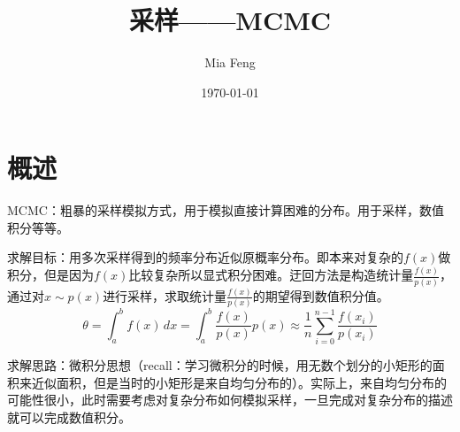 \documentclass{ctexart}
\title{采样——MCMC} %
\author{Mia Feng} %
\date{\today} %
\begin{document}
\maketitle %




\section{概述}
MCMC：粗暴的采样模拟方式，用于模拟直接计算困难的分布。用于采样，数值积分等等。

求解目标：用多次采样得到的频率分布近似原概率分布。即本来对复杂的$f\left(x\right)$做积分，但是因为$f\left(x\right)$比较复杂所以显式积分困难。迂回方法是构造统计量$\frac{f\left(x\right)}{p\left(x\right)}$，通过对$x\sim p\left(x\right)$进行采样，求取统计量$\frac{f\left(x\right)}{p\left(x\right)}$的期望得到数值积分值。
\begin{equation}
\theta = \int_{a}^{b}f\left(x\right)\,dx=\int_{a}^{b}\frac{f\left(x\right)}{p\left(x\right)}p\left(x\right)\approx \frac{1}{n}\sum\limits_{i=0}^{n-1}\frac{f\left(x_i\right)}{p\left(x_i\right)}
\end{equation}

求解思路：微积分思想（recall：学习微积分的时候，用无数个划分的小矩形的面积来近似面积，但是当时的小矩形是来自均匀分布的）。实际上，来自均匀分布的可能性很小，此时需要考虑对复杂分布如何模拟采样，一旦完成对复杂分布的描述就可以完成数值积分。
\end{document}

